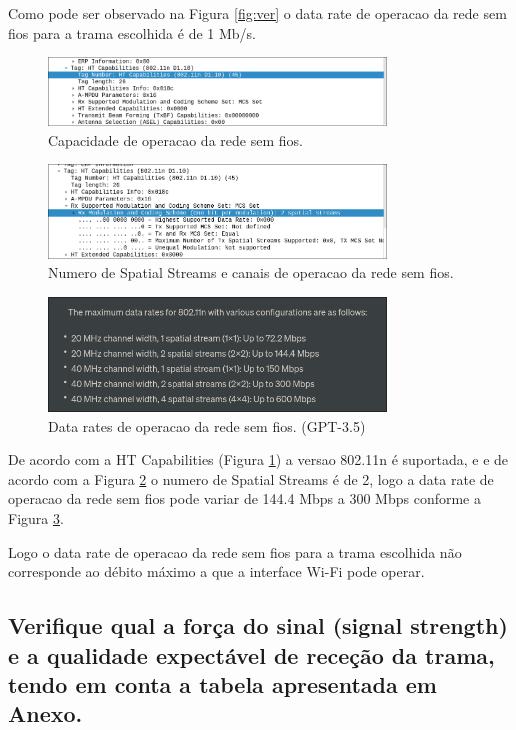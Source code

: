 Como pode ser observado na Figura \ref{fig:ver} o data rate de operacao da rede sem fios para a trama escolhida é de 1 Mb/s.

\begin{figure}[h]
    \centering
    \includegraphics[width=0.8\textwidth]{ht.png}
    \caption{\label{fig:ht}Capacidade de operacao da rede sem fios.}
\end{figure}

\begin{figure}[h]
    \centering
    \includegraphics[width=0.8\textwidth]{channels.png}
    \caption{\label{fig:channels}Numero de Spatial Streams e canais de operacao da rede sem fios.}
\end{figure}

\begin{figure}[h]
    \centering
    \includegraphics[width=0.8\textwidth]{chat.png}
    \caption{\label{fig:chat}Data rates de operacao da rede sem fios. (GPT-3.5)}
\end{figure}

De acordo com a HT Capabilities (Figura \ref{fig:ht}) a versao 802.11n é suportada, e
e de acordo com a Figura \ref{fig:channels} o numero de Spatial Streams é de 2, logo a data rate de operacao da rede sem fios pode variar de 144.4 Mbps a 300 Mbps conforme a Figura \ref{fig:chat}.

Logo o data rate de operacao da rede sem fios para a trama escolhida não corresponde ao débito máximo a que a interface Wi-Fi pode operar.

\subsection{Verifique qual a força do sinal (signal strength) e a qualidade expectável de  receção da trama, tendo em conta a tabela apresentada em Anexo.}

